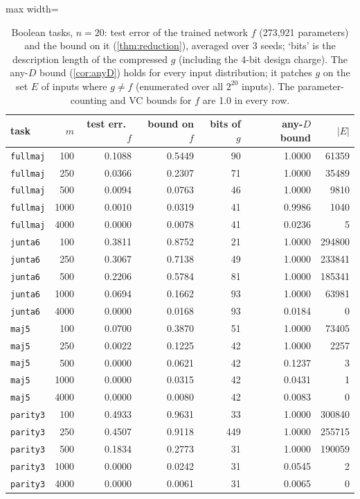 \begin{table}[t]
\centering\small
\begin{adjustbox}{max width=\linewidth}\begin{tabular}{l r r r r r r}
\toprule
task & $m$ & test err.\ $f$ & bound on $f$ & bits of $g$ & any-$D$ bound & $|E|$ \\
\midrule
\texttt{fullmaj} & 100 & 0.1088 & 0.5449 & 90 & 1.0000 & 61359 \\
\texttt{fullmaj} & 250 & 0.0366 & 0.2307 & 71 & 1.0000 & 35489 \\
\texttt{fullmaj} & 500 & 0.0094 & 0.0763 & 46 & 1.0000 & 9810 \\
\texttt{fullmaj} & 1000 & 0.0010 & 0.0319 & 41 & 0.9986 & 1040 \\
\texttt{fullmaj} & 4000 & 0.0000 & 0.0078 & 41 & 0.0236 & 5 \\
\addlinespace[2pt]
\texttt{junta6} & 100 & 0.3811 & 0.8752 & 21 & 1.0000 & 294800 \\
\texttt{junta6} & 250 & 0.3067 & 0.7138 & 49 & 1.0000 & 233841 \\
\texttt{junta6} & 500 & 0.2206 & 0.5784 & 81 & 1.0000 & 185341 \\
\texttt{junta6} & 1000 & 0.0694 & 0.1662 & 93 & 1.0000 & 63981 \\
\texttt{junta6} & 4000 & 0.0000 & 0.0168 & 93 & 0.0184 & 0 \\
\addlinespace[2pt]
\texttt{maj5} & 100 & 0.0700 & 0.3870 & 51 & 1.0000 & 73405 \\
\texttt{maj5} & 250 & 0.0022 & 0.1225 & 42 & 1.0000 & 2257 \\
\texttt{maj5} & 500 & 0.0000 & 0.0621 & 42 & 0.1237 & 3 \\
\texttt{maj5} & 1000 & 0.0000 & 0.0315 & 42 & 0.0431 & 1 \\
\texttt{maj5} & 4000 & 0.0000 & 0.0080 & 42 & 0.0083 & 0 \\
\addlinespace[2pt]
\texttt{parity3} & 100 & 0.4933 & 0.9631 & 33 & 1.0000 & 300840 \\
\texttt{parity3} & 250 & 0.4507 & 0.9118 & 449 & 1.0000 & 255715 \\
\texttt{parity3} & 500 & 0.1834 & 0.2773 & 31 & 1.0000 & 190059 \\
\texttt{parity3} & 1000 & 0.0000 & 0.0242 & 31 & 0.0545 & 2 \\
\texttt{parity3} & 4000 & 0.0000 & 0.0061 & 31 & 0.0065 & 0 \\
\bottomrule
\end{tabular}\end{adjustbox}
\caption{Boolean tasks, $n=20$: test error of the trained network $f$ (273,921 parameters) and the bound on it (\cref{thm:reduction}), averaged over 3 seeds; `bits' is the description length of the compressed $g$ (including the 4-bit design charge). The any-$D$ bound (\cref{cor:anyD}) holds for every input distribution; it patches $g$ on the set $E$ of inputs where $g\ne f$ (enumerated over all $2^{20}$ inputs). The parameter-counting and VC bounds for $f$ are 1.0 in every row.}\label{tab:boolean_n20}
\end{table}
